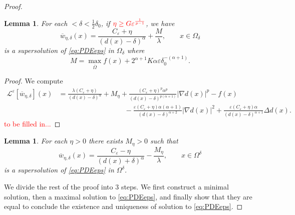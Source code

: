\documentclass[11pt,reqno]{amsart}
\numberwithin{figure}{section}
\theoremstyle{plain}
\newtheorem{lem}[thm]{Lemma}
\theoremstyle{remark}
\numberwithin{equation}{section}
\begin{document}
\begin{proof}
\begin{lem}\label{lem:subsln} For each $<\delta < \frac{1}{2}\delta_0$, if $\color{red}\eta\geq G\varepsilon^{\frac{1}{p-1}}$,\color{black} we have
\begin{equation*}
    \overline{w}_{\eta,\delta}(x) = \frac{C_\varepsilon+\eta}{(d(x)-\delta)^\alpha} +\frac{M}{\lambda},\qquad x\in \Omega_\delta
\end{equation*}
is a supersolution of \eqref{eq:PDEeps} in $\Omega_\delta$ where
\begin{equation*}
    M = \max_{\overline{\Omega}} f(x) + 2^{\alpha+1}K\alpha\varepsilon\delta_0^{-(\alpha+1)}.
\end{equation*}
\end{lem}
\begin{proof} We compute
\begin{align*}
    \mathcal{L}^\varepsilon\left[\overline{w}_{\eta,\delta}\right](x) &= \frac{\lambda(C_\varepsilon + \eta)}{(d(x)-\delta)^\alpha} + M_\eta + \frac{(C_\varepsilon+\eta)^p \alpha^p}{(d(x)-\delta)^{p(\alpha+1)}}|\nabla d(x)|^p - f(x) \\
    &\qquad\qquad\qquad\qquad\quad\;\,  - \frac{\varepsilon(C_\varepsilon+\eta)\alpha(\alpha+1)}{(d(x)-\delta)^{\alpha+2}}|\nabla d(x)|^2 + \frac{\varepsilon(C_\varepsilon+\eta)\alpha}{(d(x)-\delta)^{\alpha+1}}\Delta d(x).
\end{align*}
\textcolor{red}{to be filled in...}
\end{proof}

\begin{lem}\label{lem:supersln} For each $\eta>0$ there exists $M_\eta > 0$ such that 
\begin{equation*}
    \overline{w}_{\eta,\delta}(x) = \frac{C_\varepsilon-\eta}{(d(x)+\delta)^\alpha} -\frac{M_\eta}{\lambda}, \qquad x\in \Omega^\delta
\end{equation*}
is a supersolution of \eqref{eq:PDEeps} in $\Omega^\delta$.
\end{lem}


We divide the rest of the proof into 3 steps. We first construct a minimal solution, then a maximal solution to \eqref{eq:PDEeps}, and finally show that they are equal to conclude the existence and uniqueness of solution to \eqref{eq:PDEeps}.


\end{proof}
\end{document}
